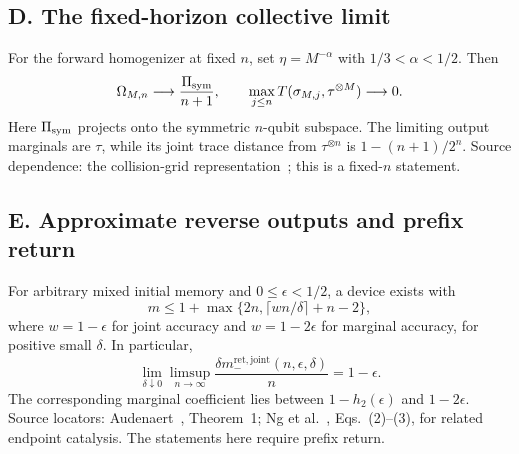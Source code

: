 \documentclass[11pt]{article}
\begin{document}
\par\medskip
\noindent\begin{minipage}{\linewidth}
\subsection*{D. The fixed-horizon collective limit}
For the forward homogenizer at fixed $n$, set $\eta=M^{-\alpha}$ with $1/3<\alpha<1/2$. Then
\[
 \Omega_{M,n}\longrightarrow\frac{\Pi_{\rm sym}}{n+1},\qquad
 \max_{j\le n}T(\sigma_{M,j},\tau^{\otimes M})\longrightarrow0.
\]
Here $\Pi_{\rm sym}$ projects onto the symmetric $n$-qubit subspace. The limiting output marginals are $\tau$, while its joint trace distance from $\tau^{\otimes n}$ is $1-(n+1)/2^n$. Source dependence: the collision-grid representation~\cite{gp,cascade}; this is a fixed-$n$ statement.


\end{minipage}
\par\medskip
\noindent\begin{minipage}{\linewidth}
\subsection*{E. Approximate reverse outputs and prefix return}
For arbitrary mixed initial memory and $0\le\epsilon<1/2$, a device exists with
\[
 m\le1+\max\{2n,\lceil wn/\delta\rceil+n-2\},
\]
where $w=1-\epsilon$ for joint accuracy and $w=1-2\epsilon$ for marginal accuracy, for positive small $\delta$. In particular,
\[
 \lim_{\delta\downarrow0}\limsup_{n\to\infty}
 \frac{\delta m_-^{\mathrm{ret,joint}}(n,\epsilon,\delta)}n=1-\epsilon.
\]
The corresponding marginal coefficient lies between $1-h_2(\epsilon)$ and $1-2\epsilon$. Source locators: Audenaert~\cite{audenaert}, Theorem~1; Ng et al.~\cite{ng}, Eqs.~(2)--(3), for related endpoint catalysis. The statements here require prefix return.


\end{minipage}
\par\medskip
\end{document}
